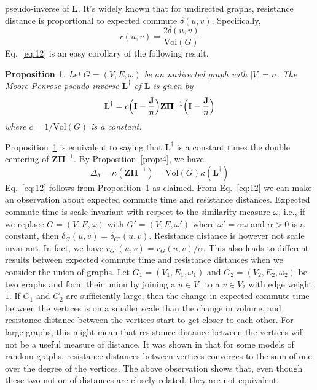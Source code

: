 \documentclass[10pt,twocolumn]{article}
\newtheorem{proposition}[theorem]{Proposition}
\numberwithin{equation}{section}
\begin{document}
\/pseudo-inverse of $\mathbf{L}$. It's widely known that for
undirected graphs, resistance distance is proportional to expected
commute $\delta(u,v)$. Specifically,
\begin{equation}
  \label{eq:12}
  r(u,v) = \frac{2 \delta(u,v)}{\mathrm{Vol}(G)}
\end{equation}
Eq.~\eqref{eq:12} is an easy corollary of the following result.
\begin{proposition}
  \label{prop:5}
  Let $G = (V,E,\omega)$ be an undirected graph with $|V| = n$. The
  Moore-Penrose pseudo-inverse $\mathbf{L}^{\dagger}$ of $\mathbf{L}$
  is given by
  \begin{equation}
    \label{eq:13}
    \mathbf{L}^{\dagger} = c \Bigl(\mathbf{I} - \frac{\mathbf{J}}{n}\Bigr) \mathbf{Z}
    \bm{\Pi}^{-1} \Bigl(\mathbf{I} - \frac{\mathbf{J}}{n}\Bigr)
  \end{equation}
  where $c = 1/\mathrm{Vol}(G)$ is a constant. 
\end{proposition}
Proposition~\ref{prop:5} is equivalent to saying that
$\mathbf{L}^{\dagger}$ is a constant times the double centering of
$\mathbf{Z}\bm{\Pi}^{-1}$. By Proposition~\ref{prop:4}, we have 
\begin{equation}
  \label{eq:42}
 \Delta_{\delta} = \kappa(\mathbf{Z}\bm{\Pi}^{-1}) = \mathrm{Vol}(G)
\kappa(\mathbf{L}^{\dagger}) 
\end{equation}
Eq.~\eqref{eq:12} follows from Proposition~\ref{prop:5} as
claimed. From Eq.~\eqref{eq:12} we can make an observation about
expected commute time and resistance distances. Expected commute time
is scale invariant with respect to the similarity measure $\omega$,
i.e., if we replace $G = (V,E,\omega)$ with $G' = (V,E,\omega')$ where
$\omega' = \alpha \omega$ and $\alpha > 0$ is a constant, then
$\delta_{G}(u,v) = \delta_{G'}(u,v)$. Resistance distance is however
not scale invariant. In fact, we have $r_{G'}(u,v) =
r_{G}(u,v)/\alpha$. This also leads to different results between
expected commute time and resistance distances when we consider the
union of graphs. Let $G_1 = (V_1, E_1, \omega_1)$ and $G_2 = (V_2,E_2,
\omega_2)$ be two graphs and form their union by joining a $u \in V_1$
to a $v \in V_2$ with edge weight $1$. If $G_1$ and $G_2$ are
sufficiently large, then the change in expected commute time between
the vertices is on a smaller scale than the change in volume, and
resistance distance between the vertices start to get closer to each
other. For large graphs, this might mean that resistance distance
between the vertices will not be a useful measure of
distance. It was shown in \cite{radl09} that for some models of random graphs,
resistance distances between vertices converges to the sum of one over
the degree of the vertices. The above observation shows that, even though
these two notion of distances are closely related, they are not
equivalent.
\end{document}

